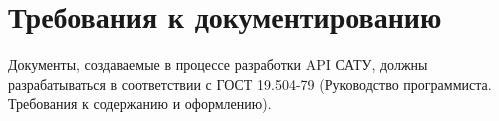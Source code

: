 \chapter{\enskip Требования к документированию}

Документы, создаваемые в процессе разработки API САТУ, должны разрабатываться в соответствии с {ГОСТ 19.504-79 (Руководство программиста. Требования к содержанию и оформлению)}.